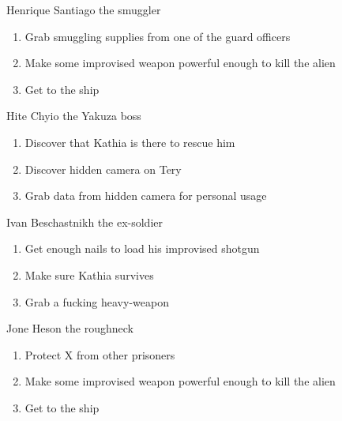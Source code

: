 \begin{rpg-commentbox}{Henrique Santiago the smuggler}
    \begin{enumerate}[label=\textbf{Act \arabic*}, leftmargin=1cm]
        \item Grab smuggling supplies from one of the guard officers
        \item Make some improvised weapon powerful enough to kill the alien
        \item Get to the ship
    \end{enumerate}
\end{rpg-commentbox}

\begin{rpg-commentbox}{Hite Chyio the Yakuza boss}
    \begin{enumerate}[label=\textbf{Act \arabic*}, leftmargin=1cm]
        \item Discover that Kathia is there to rescue him
        \item Discover hidden camera on Tery
        \item Grab data from hidden camera for personal usage
    \end{enumerate}
    
\end{rpg-commentbox}

\begin{rpg-commentbox}{Ivan Beschastnikh the ex-soldier}
    \begin{enumerate}[label=\textbf{Act \arabic*}, leftmargin=1cm]
        \item Get enough nails to load his improvised shotgun
        \item Make sure Kathia survives
        \item Grab a fucking heavy-weapon
    \end{enumerate}
\end{rpg-commentbox}

\begin{rpg-commentbox}{Jone Heson the roughneck}
    \begin{enumerate}[label=\textbf{Act \arabic*}, leftmargin=1cm]
        \item Protect X from other prisoners
        \item Make some improvised weapon powerful enough to kill the alien
        \item Get to the ship
    \end{enumerate}
\end{rpg-commentbox}

